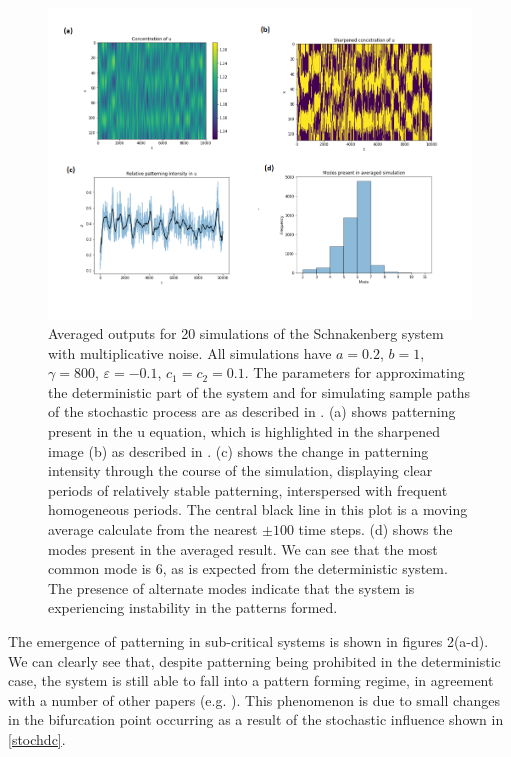 \documentclass[12pt]{article}
\begin{document}
\begin{figure}
  \includegraphics[scale = 0.65]{Fig_2.png}
  \caption{Averaged outputs for 20 simulations of the Schnakenberg system with multiplicative noise. All simulations have $a = 0.2$, $b = 1$, $\gamma = 800$, $\varepsilon = -0.1$, $c_1 = c_2 = 0.1$. The parameters for approximating the deterministic part of the system and for simulating sample paths of the stochastic process are as described in . (a) shows patterning present in the u equation, which is highlighted in the sharpened image (b) as described in . (c) shows the change in patterning intensity through the course of the simulation, displaying clear periods of relatively stable patterning, interspersed with frequent homogeneous periods. The central black line in this plot is a moving average calculate from the nearest $\pm 100$ time steps. (d) shows the modes present in the averaged result. We can see that the most common mode is 6, as is expected from the deterministic system. The presence of alternate modes indicate that the system is experiencing instability in the patterns formed.}
\end{figure}

The emergence of patterning in sub-critical systems is shown in figures 2(a-d). We can clearly see that, despite patterning being prohibited in the deterministic case, the system is still able to fall into a pattern forming regime, in agreement with a number of other papers (e.g. \cite{Zheng-Ping, Biancalani, Karig}). This phenomenon is due to small changes in the bifurcation point occurring as a result of the stochastic influence shown in \eqref{stochdc}. 
\end{document}
